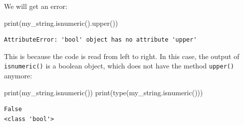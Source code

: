 \documentclass[
  letterpaper,
  DIV=11,
  numbers=noendperiod]{scrreprt}
\newenvironment{Shaded}{\begin{snugshade}}{\end{snugshade}}
\newcommand{\BuiltInTok}[1]{\textcolor[rgb]{0.00,0.23,0.31}{#1}}
\newcommand{\NormalTok}[1]{\textcolor[rgb]{0.00,0.23,0.31}{#1}}
\begin{document}
\begin{tcolorbox}[enhanced jigsaw, rightrule=.15mm, opacitybacktitle=0.6, colback=white, toprule=.15mm, colframe=quarto-callout-note-color-frame, bottomtitle=1mm, bottomrule=.15mm, arc=.35mm, coltitle=black, breakable, title={Solution to Challenge 6}, titlerule=0mm, opacityback=0, colbacktitle=quarto-callout-note-color!10!white, left=2mm, toptitle=1mm, leftrule=.75mm]

We will get an error:

\begin{Shaded}
\begin{Highlighting}[]
\BuiltInTok{print}\NormalTok{(my\_string.isnumeric().upper())}
\end{Highlighting}
\end{Shaded}

\begin{verbatim}
AttributeError: 'bool' object has no attribute 'upper'
\end{verbatim}

This is because the code is read from left to right. In this case, the
output of \texttt{isnumeric()} is a boolean object, which does not have
the method \texttt{upper()} anymore:

\begin{Shaded}
\begin{Highlighting}[]
\BuiltInTok{print}\NormalTok{(my\_string.isnumeric())}
\BuiltInTok{print}\NormalTok{(}\BuiltInTok{type}\NormalTok{(my\_string.isnumeric()))}
\end{Highlighting}
\end{Shaded}

\begin{verbatim}
False
<class 'bool'>
\end{verbatim}

\end{tcolorbox}
\end{document}
